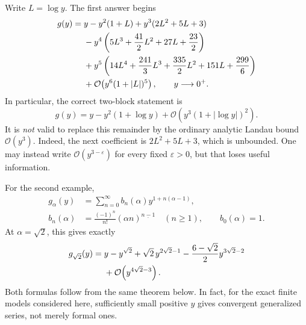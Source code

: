 \documentclass[11pt,a4paper]{article}
\numberwithin{equation}{section}
\theoremstyle{definition}
\newcommand{\OO}{\mathcal O}
\newcommand{\fall}[2]{\left(#1\right)^{\underline{#2}}}
\begin{document}
Write $L=\log y$. The first answer begins
\begin{align}
 g(y)={}&y-y^2(1+L)+y^3(2L^2+5L+3)\notag\\
 &-y^4\left(5L^3+\frac{41}{2}L^2+27L+\frac{23}{2}\right)\notag\\
 &+y^5\left(14L^4+\frac{241}{3}L^3+\frac{335}{2}L^2
                  +151L+\frac{299}{6}\right)\notag\\
 &+\OO\!\left(y^6(1+|L|)^5\right),\qquad y\longrightarrow0^+.
 \label{eq:log-answer}
\end{align}
In particular, the correct two-block statement is
\begin{equation}\label{eq:two-blocks}
 g(y)=y-y^2(1+\log y)+\OO\!\left(y^3(1+|\log y|)^2\right).
\end{equation}
It is \emph{not} valid to replace this remainder by the ordinary analytic
Landau bound $\OO(y^3)$. Indeed, the next coefficient is
$2L^2+5L+3$, which is unbounded. One may instead write
$\OO(y^{3-\varepsilon})$ for every fixed $\varepsilon>0$, but that loses
useful information.

For the second example,
\begin{align}
 g_\alpha(y)
 &=\sum_{n=0}^{\infty} b_n(\alpha)y^{1+n(\alpha-1)},\label{eq:alpha-series}\\
 b_n(\alpha)
 &=\frac{(-1)^n}{n!}\fall{\alpha n}{n-1}\quad(n\ge1),
 \qquad b_0(\alpha)=1.\label{eq:alpha-coeff}
\end{align}
At $\alpha=\sqrt2$, this gives exactly
\begin{align}
 g_{\sqrt2}(y)={}&y-y^{\sqrt2}+\sqrt2\,y^{2\sqrt2-1}
 -\frac{6-\sqrt2}{2}y^{3\sqrt2-2}\notag\\
 &+\OO\!\left(y^{4\sqrt2-3}\right).
 \label{eq:irr-answer}
\end{align}
Both formulas follow from the same theorem below. In fact, for the exact
finite models considered here, sufficiently small positive $y$ gives
convergent generalized series, not merely formal ones.
\end{document}
